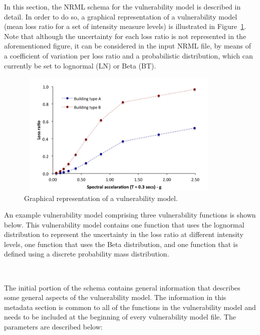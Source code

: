 In this section, the NRML schema for the \gls{vulnerability model} is
described in detail. In order to do so, a graphical representation of a
\gls{vulnerability model} (mean loss ratio for a set of intensity measure
levels) is illustrated in Figure~\ref{fig:vulModel}. Note that although the
uncertainty for each loss ratio is not represented in the aforementioned
figure, it can be considered in the input NRML file, by means of a coefficient
of variation per loss ratio and a probabilistic distribution, which can
currently be set to lognormal (LN) or Beta (BT).

\begin{figure}[ht]
\centering
\includegraphics[width=10cm,height=6cm]{figures/risk/vulnerabilityModel.pdf}
\caption{Graphical representation of a vulnerability model.}
\label{fig:vulModel}
\end{figure}

An example vulnerability model comprising three vulnerability functions is
shown below. This vulnerability model contains one function that uses the 
lognormal distribution to represent the uncertainty in the loss ratio at 
different intensity levels, one function that uses the Beta distribution, and
one function that is defined using a discrete probability mass distribution.

\inputminted[firstline=1,firstnumber=1,fontsize=\footnotesize,frame=single,linenos,bgcolor=lightgray]{xml}{oqum/risk/Verbatim/input_vulnerability.xml}\\


The initial portion of the schema contains general information that describes
some general aspects of the vulnerability model. The information in this
metadata section is common to all of the functions in the vulnerability model
and needs to be included at the beginning of every vulnerability model file.
The parameters are described below:

